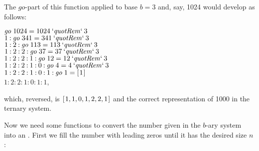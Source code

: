 \documentclass{scrreprt}
\newcommand{\Varid}[1]{\mathit{#1}}
\begin{document}
The \ensuremath{\Varid{go}}-part of this function applied to base $b = 3$
and, say, \num{1024} would develop
as follows:

\ensuremath{\Varid{go}\;\mathrm{1024}\mathrel{=}\mathrm{1024}\mathbin{`\Varid{quotRem}`}\mathrm{3}}\\
\ensuremath{\mathrm{1}\mathbin{:}\Varid{go}\;\mathrm{341}\mathrel{=}\mathrm{341}\mathbin{`\Varid{quotRem}`}\mathrm{3}}\\
\ensuremath{\mathrm{1}\mathbin{:}\mathrm{2}\mathbin{:}\Varid{go}\;\mathrm{113}\mathrel{=}\mathrm{113}\mathbin{`\Varid{quotRem}`}\mathrm{3}}\\
\ensuremath{\mathrm{1}\mathbin{:}\mathrm{2}\mathbin{:}\mathrm{2}\mathbin{:}\Varid{go}\;\mathrm{37}\mathrel{=}\mathrm{37}\mathbin{`\Varid{quotRem}`}\mathrm{3}}\\
\ensuremath{\mathrm{1}\mathbin{:}\mathrm{2}\mathbin{:}\mathrm{2}\mathbin{:}\mathrm{1}\mathbin{:}\Varid{go}\;\mathrm{12}\mathrel{=}\mathrm{12}\mathbin{`\Varid{quotRem}`}\mathrm{3}}\\
\ensuremath{\mathrm{1}\mathbin{:}\mathrm{2}\mathbin{:}\mathrm{2}\mathbin{:}\mathrm{1}\mathbin{:}\mathrm{0}\mathbin{:}\Varid{go}\;\mathrm{4}\mathrel{=}\mathrm{4}\mathbin{`\Varid{quotRem}`}\mathrm{3}}\\
\ensuremath{\mathrm{1}\mathbin{:}\mathrm{2}\mathbin{:}\mathrm{2}\mathbin{:}\mathrm{1}\mathbin{:}\mathrm{0}\mathbin{:}\mathrm{1}\mathbin{:}\Varid{go}\;\mathrm{1}\mathrel{=}[\mskip1.5mu \mathrm{1}\mskip1.5mu]}\\
\ensuremath{\mathrm{1}\mathbin{:}\mathrm{2}\mathbin{:}\mathrm{2}\mathbin{:}\mathrm{1}\mathbin{:}\mathrm{0}\mathbin{:}\mathrm{1}\mathbin{:}\mathrm{1}},

which, reversed, is \ensuremath{[\mskip1.5mu \mathrm{1},\mathrm{1},\mathrm{0},\mathrm{1},\mathrm{2},\mathrm{2},\mathrm{1}\mskip1.5mu]}
and the correct representation of \num{1000}
in the ternary system.

Now we need some functions to convert 
the number given in the $b$-ary system
into an . 
First we fill the number with leading zeros
until it has the desired size $n$:
\end{document}
